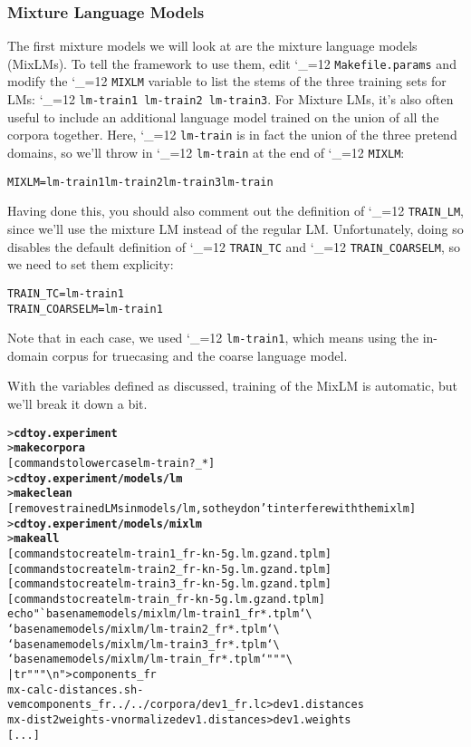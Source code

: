 \documentclass[11pt,letterpaper]{article}
\newcommand{\bs}{\textbackslash{}}
\def\code{\begingroup\catcode`\_=12 \codex}
\newcommand{\codex}[1]{\texttt{#1}\endgroup}
\begin{document}
\subsubsection{Mixture Language Models} \label{MIXLM}

The first mixture models we will look at are the mixture language models
(MixLMs).  To tell the framework to use them, edit
\code{Makefile.params} and modify the \code{MIXLM} variable to list the stems
of the three training sets for LMs: \code{lm-train1 lm-train2 lm-train3}.  For
Mixture LMs, it's also often useful to include an additional language model
trained on the union of all the corpora together.  Here, \code{lm-train} is
in fact the union of the three pretend domains, so we'll throw in
\code{lm-train} at the end of \code{MIXLM}:
\begin{small}
\begin{alltt}
   MIXLM = lm-train1 lm-train2 lm-train3 lm-train
\end{alltt}
\end{small}

Having done this, you should also comment out the definition of
\code{TRAIN_LM}, since we'll use the mixture LM instead of the regular LM.
Unfortunately, doing so disables the default definition of \code{TRAIN_TC} and
\code{TRAIN_COARSELM}, so we need to set them explicity:
\begin{small}
\begin{alltt}
   TRAIN_TC = lm-train1
   TRAIN_COARSELM = lm-train1
\end{alltt}
\end{small}
Note that in each case, we used \code{lm-train1}, which means using the
in-domain corpus for truecasing and the coarse language model.

With the variables defined as discussed, training of the MixLM is automatic,
but we'll break it down a bit.
\begin{small}
\begin{alltt}
   > \textbf{cd toy.experiment}
   > \textbf{make corpora}
   [commands to lowercase lm-train?_*]
   > \textbf{cd toy.experiment/models/lm}
   > \textbf{make clean}
   [removes trained LMs in models/lm, so they don't interfere with the mixlm]
   > \textbf{cd toy.experiment/models/mixlm}
   > \textbf{make all}
   [commands to create lm-train1_fr-kn-5g.lm.gz and .tplm]
   [commands to create lm-train2_fr-kn-5g.lm.gz and .tplm]
   [commands to create lm-train3_fr-kn-5g.lm.gz and .tplm]
   [commands to create lm-train_fr-kn-5g.lm.gz and .tplm]
   echo "`basename models/mixlm/lm-train1_fr*.tplm` \bs
         `basename models/mixlm/lm-train2_fr*.tplm` \bs
         `basename models/mixlm/lm-train3_fr*.tplm` \bs
         `basename models/mixlm/lm-train_fr*.tplm`" "" \bs
      | tr " " "\bs{}n" > components_fr
   mx-calc-distances.sh -v em components_fr ../../corpora/dev1_fr.lc > dev1.distances
   mx-dist2weights -v normalize dev1.distances > dev1.weights
   [...]
\end{alltt}
\end{small}
\end{document}
